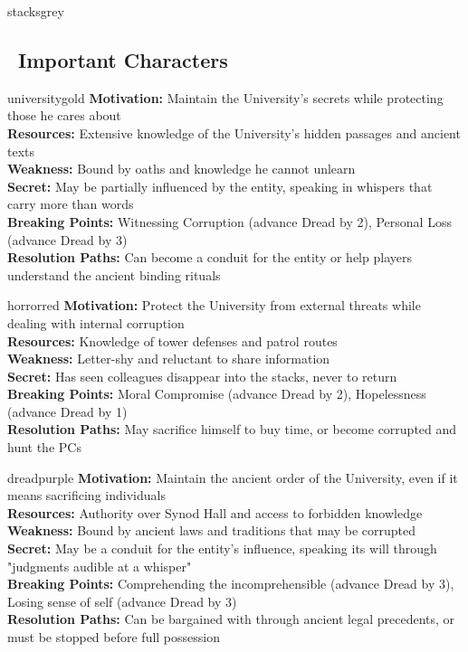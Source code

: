 \documentclass[11pt]{article}
\begin{document}
\begin{campaignsection}{stacksgrey}
\subsection*{\faUsers\ Important Characters}

\begin{npcbox}{universitygold}
\textbf{Motivation:} Maintain the University's secrets while protecting those he cares about\\
\textbf{Resources:} Extensive knowledge of the University's hidden passages and ancient texts\\
\textbf{Weakness:} Bound by oaths and knowledge he cannot unlearn\\
\textbf{Secret:} May be partially influenced by the entity, speaking in whispers that carry more than words\\
\textbf{Breaking Points:} Witnessing Corruption (advance Dread by 2), Personal Loss (advance Dread by 3)\\
\textbf{Resolution Paths:} Can become a conduit for the entity or help players understand the ancient binding rituals
\end{npcbox}

\begin{npcbox}{horrorred}
\textbf{Motivation:} Protect the University from external threats while dealing with internal corruption\\
\textbf{Resources:} Knowledge of tower defenses and patrol routes\\
\textbf{Weakness:} Letter-shy and reluctant to share information\\
\textbf{Secret:} Has seen colleagues disappear into the stacks, never to return\\
\textbf{Breaking Points:} Moral Compromise (advance Dread by 2), Hopelessness (advance Dread by 1)\\
\textbf{Resolution Paths:} May sacrifice himself to buy time, or become corrupted and hunt the PCs
\end{npcbox}

\begin{npcbox}{dreadpurple}
\textbf{Motivation:} Maintain the ancient order of the University, even if it means sacrificing individuals\\
\textbf{Resources:} Authority over Synod Hall and access to forbidden knowledge\\
\textbf{Weakness:} Bound by ancient laws and traditions that may be corrupted\\
\textbf{Secret:} May be a conduit for the entity's influence, speaking its will through "judgments audible at a whisper"\\
\textbf{Breaking Points:} Comprehending the incomprehensible (advance Dread by 3), Losing sense of self (advance Dread by 3)\\
\textbf{Resolution Paths:} Can be bargained with through ancient legal precedents, or must be stopped before full possession
\end{npcbox}


\end{campaignsection}
\end{document}

